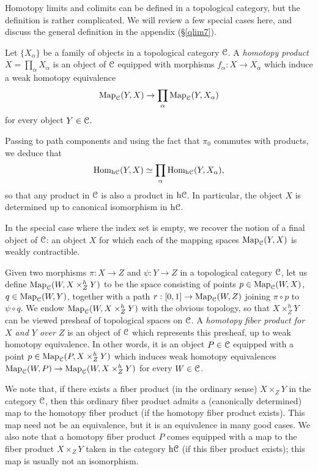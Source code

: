 \begin{Didn't Read}
Homotopy limits and
colimits can be defined in a topological category, but the
definition is rather complicated. We will review a few special cases here, and discuss the general definition in the appendix (\S \ref{qlim7}).

\begin{example}\label{examprod}
Let $\{ X_{\alpha} \}$ be a family of objects in a topological
category $\operatorname{\mathcal{C}}$. A {\it homotopy product} $X = \prod_{\alpha}
X_{\alpha}$ is an object of $\operatorname{\mathcal{C}}$ equipped with morphisms
$f_{\alpha}: X \rightarrow X_{\alpha}$ which induce a weak
homotopy equivalence
$$ \operatorname{{Map}}_{\operatorname{\mathcal{C}}}(Y,X) \rightarrow \prod_{\alpha} \operatorname{{Map}}_{\operatorname{\mathcal{C}}}(Y,
X_{\alpha})$$ for every object $Y \in \operatorname{\mathcal{C}}$.

Passing to path components and using the fact that $\pi_0$
commutes with products, we deduce that $$\operatorname{Hom}_{\rm{h} \it{\operatorname{\mathcal{C}}}}(Y,X) \simeq
\prod_{\alpha} \operatorname{Hom}_{\rm{h} \it{\operatorname{\mathcal{C}}}}(Y, X_{\alpha}),$$ so that any product in $\operatorname{\mathcal{C}}$ is
also a product in $\rm{h} \it{\operatorname{\mathcal{C}}}$. In particular, the object $X$ is
determined up to canonical isomorphism in $\rm{h} \it{\operatorname{\mathcal{C}}}$.

In the special case where the index set is empty, we recover the
notion of a final object of $\operatorname{\mathcal{C}}$: an object $X$ for which each
of the mapping spaces $\operatorname{{Map}}_{\operatorname{\mathcal{C}}}(Y,X)$ is weakly contractible.
\end{example}

\begin{example}\label{exampull}
Given two morphisms $\pi: X \rightarrow Z$ and $\psi: Y \rightarrow Z$
in a topological category $\operatorname{\mathcal{C}}$, let us define $\operatorname{{Map}}_{\operatorname{\mathcal{C}}}(W,
X \times^h_Z Y)$ to be the space consisting of points $p \in
\operatorname{{Map}}_{\operatorname{\mathcal{C}}}(W,X)$, $q \in \operatorname{{Map}}_{\operatorname{\mathcal{C}}}(W,Y)$, together with a path $r: [0,1]
\rightarrow \operatorname{{Map}}_{\operatorname{\mathcal{C}}}(W,Z)$ joining $\pi \circ p$ to $\psi \circ q$. We
endow $\operatorname{{Map}}_{\operatorname{\mathcal{C}}}(W, X \times^h_Z Y)$ with the obvious topology,
so that $X \times^h_Z Y$ can be viewed presheaf of topological spaces
on $\operatorname{\mathcal{C}}$. A {\it homotopy fiber product for $X$ and $Y$ over
$Z$} is an object of $\operatorname{\mathcal{C}}$ which represents this presheaf, up to
weak homotopy equivalence. In other words, it is an object $P \in \operatorname{\mathcal{C}}$
equipped with a point $p \in \operatorname{{Map}}_{\operatorname{\mathcal{C}}}(P, X \times^h_Z Y)$ which
induces weak homotopy equivalences $\operatorname{{Map}}_{\operatorname{\mathcal{C}}}(W,P) \rightarrow
\operatorname{{Map}}_{\operatorname{\mathcal{C}}}(W, X \times^h_Z Y)$ for every $W \in \operatorname{\mathcal{C}}$.

We note that, if there exists a fiber product (in the ordinary sense) $X \times_Z Y$ in the category
$\operatorname{\mathcal{C}}$, then this ordinary fiber product admits a (canonically determined) map to the homotopy fiber product (if the homotopy fiber product exists). This map need not be an equivalence, but it is an equivalence in many good cases. We also note that a homotopy fiber product $P$ comes equipped with a map
to the fiber product $X \times_Z Y$ taken in the category $\rm{h} \it{\operatorname{\mathcal{C}}}$ (if this fiber product exists); this map is usually not an isomorphism.
\end{example}


\end{Didn't Read}
